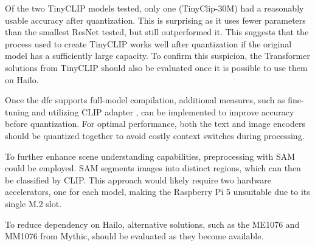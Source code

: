 Of the two TinyCLIP models tested, only one (TinyClip-30M) had a reasonably usable accuracy after quantization.
This is surprising as it uses fewer parameters than the smallest ResNet tested, but still outperformed it.
This suggests that the process used to create TinyCLIP works well after quantization if the original model has a sufficiently large capacity.
To confirm this suspicion, the Transformer solutions from TinyCLIP should also be evaluated once it is possible to use them on Hailo.

Once the \acrshort{dfc} supports full-model compilation, additional measures, such as fine-tuning and utilizing CLIP adapter \cite{clipadapter}, can be implemented to improve accuracy before quantization.  
For optimal performance, both the text and image encoders should be quantized together to avoid costly context switches during processing.  

To further enhance scene understanding capabilities, preprocessing with SAM \cite{sam} could be employed.  
SAM segments images into distinct regions, which can then be classified by CLIP.  
This approach would likely require two hardware accelerators, one for each model, making the Raspberry Pi 5 unsuitable due to its single M.2 slot.  

To reduce dependency on Hailo, alternative solutions, such as the ME1076 and MM1076 from Mythic, should be evaluated as they become available.  

